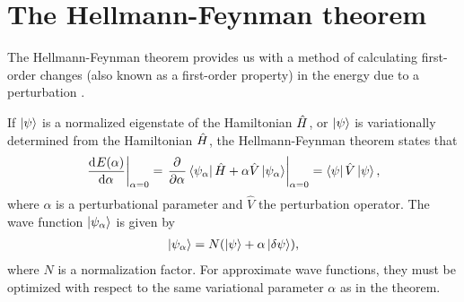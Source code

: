     \section{The Hellmann-Feynman theorem}
        The Hellmann-Feynman theorem provides us with a method of calculating
        first-order changes (also known as a first-order property) in the energy
        due to a perturbation \cite{helgaker-molecular}.
        \begin{theorem}
            If $\ket{\psi}$ is a normalized eigenstate of the Hamiltonian
            $\hat{H}$, or $\ket{\psi}$ is variationally determined from the
            Hamiltonian $\hat{H}$, the Hellmann-Feynman theorem \cite{feynman}
            states that
            \begin{align}
                \left.\dod[]{E(\alpha)}{\alpha}\right\rvert_{\alpha = 0}
                =
                \left.
                \dpd[]{}{\alpha}
                \bra{\psi_{\alpha}}\hamil + \alpha\hat{V}\ket{\psi_{\alpha}}
                \right\rvert_{\alpha = 0}
                = \bra{\psi}\hat{V}\ket{\psi},
                \label{eq:hellmann-feynman}
            \end{align}
            where $\alpha$ is a perturbational parameter and $\hat{V}$ the
            perturbation operator.
            The wave function $\ket{\psi_{\alpha}}$ is given by
            \begin{align}
                \ket{\psi_{\alpha}} = N(\ket{\psi} + \alpha\ket{\delta\psi}),
            \end{align}
            where $N$ is a normalization factor.
            For approximate wave functions, they must be optimized with respect
            to the same variational parameter $\alpha$ as in the theorem.
        \end{theorem}
